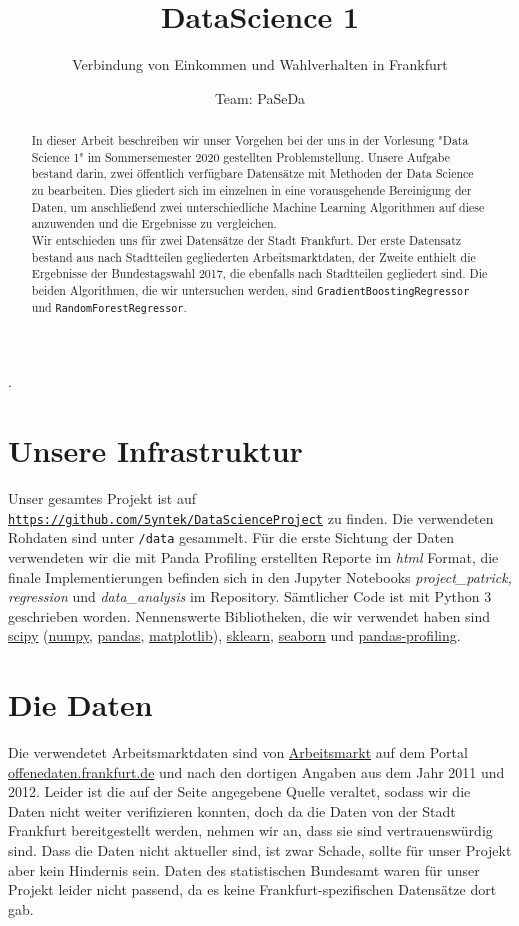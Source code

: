 \documentclass[a4paper,10pt]{scrartcl}
\title{\vspace{2cm} DataScience 1 }
\subtitle{\vspace{4cm}Verbindung von Einkommen und Wahlverhalten in Frankfurt}
\author{\vspace{5cm}Team: PaSeDa}
\date{}
\begin{document}
\maketitle
\newpage
\begin{abstract}
In dieser Arbeit beschreiben wir unser Vorgehen bei der uns in der Vorlesung "Data Science 1" im Sommersemester 2020 gestellten Problemstellung. Unsere Aufgabe bestand darin, zwei öffentlich verfügbare Datensätze mit Methoden der Data Science zu bearbeiten. Dies gliedert sich im einzelnen in eine vorausgehende Bereinigung der Daten, um anschließend zwei unterschiedliche Machine Learning Algorithmen auf diese anzuwenden und die Ergebnisse zu vergleichen.\\
Wir entschieden uns für zwei Datensätze der Stadt Frankfurt. Der erste Datensatz bestand aus nach Stadtteilen gegliederten Arbeitsmarktdaten, der Zweite enthielt die Ergebnisse der Bundestagswahl 2017, die ebenfalls nach Stadtteilen gegliedert sind. Die beiden Algorithmen, die wir untersuchen werden, sind \lstinline|GradientBoostingRegressor| und \lstinline|RandomForestRegressor|. \\
\end{abstract}
\newpage
\tableofcontents
.
\newpage
\section{Unsere Infrastruktur}
Unser gesamtes Projekt ist auf \href{Github}{\lstinline|https://github.com/5yntek/DataScienceProject|} zu finden. Die verwendeten Rohdaten sind unter \lstinline|/data| gesammelt. Für die erste Sichtung der Daten verwendeten wir die mit Panda Profiling erstellten Reporte im \textit{html} Format, die finale Implementierungen befinden sich in den Jupyter Notebooks \textit{project\_patrick, regression} und \textit{data\_analysis} im Repository. Sämtlicher Code ist mit Python 3 geschrieben worden. Nennenswerte Bibliotheken, die wir verwendet haben sind \href{https://www.scipy.org/}{scipy} (\href{https://numpy.org/}{numpy}, \href{https://pandas.pydata.org/}{pandas}, \href{https://matplotlib.org/}{matplotlib}), \href{https://scikit-learn.org/}{sklearn}, \href{https://seaborn.pydata.org/}{seaborn}  und \href{https://github.com/pandas-profiling/pandas-profiling}{pandas-profiling}.


\section{Die Daten}
Die verwendetet Arbeitsmarktdaten sind von \href{https://offenedaten.frankfurt.de/dataset/arbeitsmarkt}{Arbeitsmarkt} auf dem Portal \href{https://offenedaten.frankfurt.de} {offenedaten.frankfurt.de} und nach den dortigen Angaben  aus dem Jahr 2011 und 2012. Leider ist die auf der Seite angegebene Quelle veraltet, sodass wir die Daten nicht weiter verifizieren konnten, doch da die Daten von der Stadt Frankfurt bereitgestellt werden, nehmen wir an, dass sie sind vertrauenswürdig sind. Dass die Daten nicht aktueller sind, ist zwar Schade, sollte für unser Projekt aber kein Hindernis sein. Daten des statistischen Bundesamt waren für unser Projekt leider nicht passend, da es keine Frankfurt-spezifischen Datensätze dort gab. 
\end{document}
